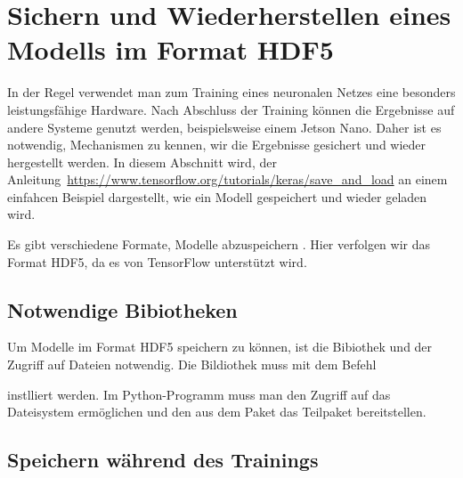 

\section{Sichern und Wiederherstellen eines Modells im Format HDF5}


In der Regel verwendet man zum Training eines neuronalen Netzes eine besonders leistungsfähige Hardware. Nach Abschluss der Training können die Ergebnisse auf andere Systeme genutzt werden, beispielsweise einem Jetson Nano. Daher ist es notwendig, Mechanismen zu kennen, wir die Ergebnisse gesichert und wieder hergestellt werden. In diesem Abschnitt wird, der Anleitung~\url{https://www.tensorflow.org/tutorials/keras/save_and_load}  an einem einfahcen Beispiel dargestellt, wie ein Modell gespeichert und wieder geladen wird. \cite{GoogleTensorFlow:2019,StackOverflow:2019}

Es gibt verschiedene Formate, Modelle abzuspeichern \cite{bai:2019,Koziol:2011} . Hier verfolgen wir das Format HDF5, da es von TensorFlow unterstützt wird.  

\subsection{Notwendige Bibiotheken}

Um Modelle im Format HDF5 speichern zu können, ist die Bibiothek  und der Zugriff auf Dateien notwendig. Die Bildiothek muss mit dem Befehl

\medskip


\medskip

instlliert werden. Im Python-Programm muss man den Zugriff auf das Dateisystem ermöglichen und den aus dem Paket  das Teilpaket  bereitstellen.

\medskip




\medskip


\subsection{Speichern während des Trainings}

